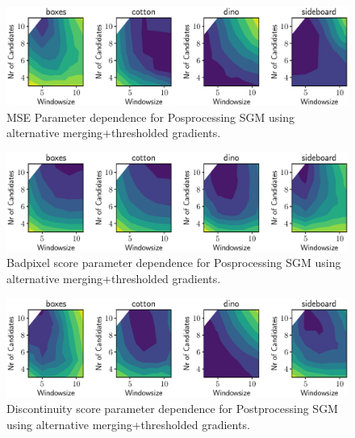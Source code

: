 \documentclass  [
  paper    = a4,
  BCOR     = 10mm,
  twoside,
  fontsize = 12pt,
  fleqn,
  toc      = bibnumbered,
  toc      = listofnumbered,
  numbers  = noendperiod,
  headings = normal,
  listof   = leveldown,
  version  = 3.03
]                                       {scrreprt}
\begin{document}
\begin{figure}
	\centering
	\includegraphics[width=1\linewidth]{images/choose_lower_sgm_ppr_contour_mse_100}
	\caption[Parameter dependence for Posprocessing SGM using alternative merging+thresholded gradients.]{MSE Parameter dependence for Posprocessing SGM using alternative merging+thresholded gradients.}
	\label{fig:chooselowersgmpprcontourmse100}
\end{figure}

\begin{figure}
	\centering
	\includegraphics[width=1\linewidth]{images/choose_lower_sgm_ppr_contour_badpix_0070}
	\caption[Badpixel Parameter dependence for Posprocessing SGM using alternative merging+thresholded gradients.]{Badpixel score parameter dependence for Posprocessing SGM using alternative merging+thresholded gradients.}
	\label{fig:chooselowersgmpprcontourbadpix_0070}
\end{figure}

\begin{figure}
	\centering
	\includegraphics[width=1\linewidth]{images/choose_lower_sgm_ppr_contour_discontinuities_0070}
	\caption[Discontinuity score Parameter dependence for Posprocessing SGM using alternative merging+thresholded gradients.]{Discontinuity score parameter dependence for Postprocessing SGM using alternative merging+thresholded gradients.}
	\label{fig:chooselowersgmpprcontourbadpixel_discontinuities0070}
\end{figure}
\end{document}
